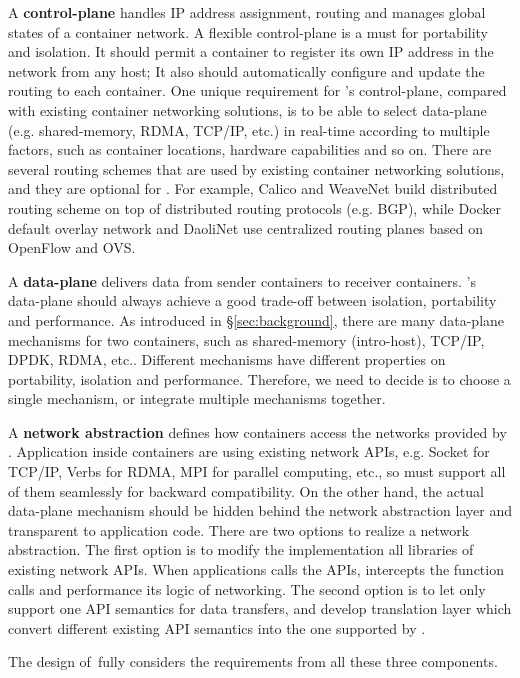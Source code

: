 A \textbf{control-plane} handles IP address assignment, routing and manages global states of a container network.
A flexible control-plane is a must for portability and isolation. 
It should permit a container to register its own IP address in the network
from any host; It also should automatically configure and update the routing 
to each container. One unique requirement for \sysname's control-plane,
compared with existing container networking solutions, is to be able to 
select data-plane (e.g. shared-memory, RDMA, TCP/IP, etc.) in real-time
according to multiple factors, such as container locations, hardware 
capabilities and so on. 
There are several routing schemes that are used by existing
container networking solutions, and they are optional for \sysname. 
For example, Calico and WeaveNet build distributed routing scheme on top of 
distributed routing protocols (e.g. BGP), while Docker default overlay network
and DaoliNet use centralized routing planes based on OpenFlow and OVS.

A \textbf{data-plane} delivers data from sender containers to receiver 
containers. \sysname's data-plane should always achieve a good trade-off
between isolation, portability and performance. 
As introduced in \S\ref{sec:background}, there are many data-plane mechanisms
for two containers, such as shared-memory (intro-host), TCP/IP, DPDK, RDMA, etc..
Different mechanisms have different properties on portability, isolation and 
performance. Therefore, we need to decide is to choose a single mechanism, or
integrate multiple mechanisms together.

A \textbf{network abstraction} defines how containers access the networks
provided by \sysname. Application inside containers are using existing 
network APIs, e.g. Socket for TCP/IP, Verbs for RDMA, MPI for parallel computing, etc., so \sysname must support all of them seamlessly for 
backward compatibility. On the other hand, the actual data-plane mechanism
should be hidden behind the network abstraction layer and transparent to 
application code. There are two options to realize a network abstraction.
The first option is to modify the implementation all libraries of existing
network APIs. When applications calls the APIs, \sysname intercepts
the function calls and performance its logic of networking. 
The second option is to let \sysname only support one API semantics for
data transfers, and develop translation layer which convert different
existing API semantics into the one supported by \sysname.

The design of~\sysname fully considers the requirements from all these three
components.

